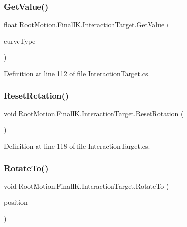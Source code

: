 \subsubsection{\texorpdfstring{Get\+Value()}{GetValue()}}
{\footnotesize\ttfamily float Root\+Motion.\+Final\+I\+K.\+Interaction\+Target.\+Get\+Value (\begin{DoxyParamCaption}\item[{\mbox{\hyperlink{class_root_motion_1_1_final_i_k_1_1_interaction_object_1_1_weight_curve_a74c8be2e80ace86b130c88e275300b27}{Interaction\+Object.\+Weight\+Curve.\+Type}}}]{curve\+Type }\end{DoxyParamCaption})}



Definition at line 112 of file Interaction\+Target.\+cs.

\mbox{\label{class_root_motion_1_1_final_i_k_1_1_interaction_target_ad12044ac58c437ad6ac440fc6e36df1e}} 
\subsubsection{\texorpdfstring{Reset\+Rotation()}{ResetRotation()}}
{\footnotesize\ttfamily void Root\+Motion.\+Final\+I\+K.\+Interaction\+Target.\+Reset\+Rotation (\begin{DoxyParamCaption}{ }\end{DoxyParamCaption})}



Definition at line 118 of file Interaction\+Target.\+cs.

\mbox{\label{class_root_motion_1_1_final_i_k_1_1_interaction_target_a2defe70ebefa8e54f20149967572da21}} 
\subsubsection{\texorpdfstring{Rotate\+To()}{RotateTo()}}
{\footnotesize\ttfamily void Root\+Motion.\+Final\+I\+K.\+Interaction\+Target.\+Rotate\+To (\begin{DoxyParamCaption}\item[{Vector3}]{position }\end{DoxyParamCaption})}



